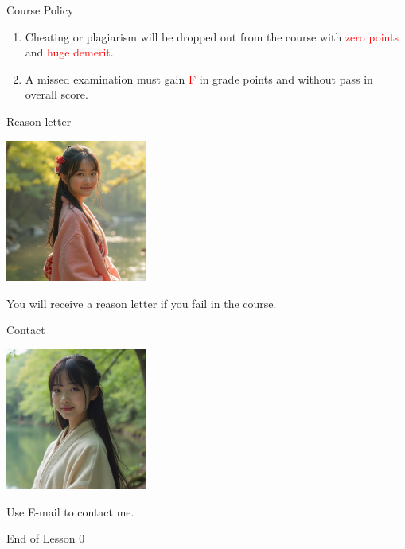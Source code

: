 \documentclass{beamer}
\begin{document}
\begin{frame}{Course Policy}
\begin{enumerate}
\item Cheating or plagiarism will be dropped out from the course with \textcolor{red}{zero points} and \textcolor{red}{huge demerit}. \\
\item A missed examination must gain \textcolor{red}{F} in grade points and without pass in overall score. 
\end{enumerate}
\end{frame}
\begin{frame}{Reason letter}
\begin{center}
\includegraphics[width=0.35\textwidth]{endeavor.png}
\end{center}
\begin{center}
You will receive a reason letter if you fail in the course.
\end{center}
\end{frame}
\begin{frame}{Contact}
\begin{center}
\includegraphics[width=0.35\textwidth]{kg.png}
\end{center}
\begin{center}
Use E-mail to contact me.
\end{center}
\end{frame}
\begin{frame}{}
\begin{center}
\Large{End of Lesson 0}
\end{center}
\end{frame}
\end{document}
